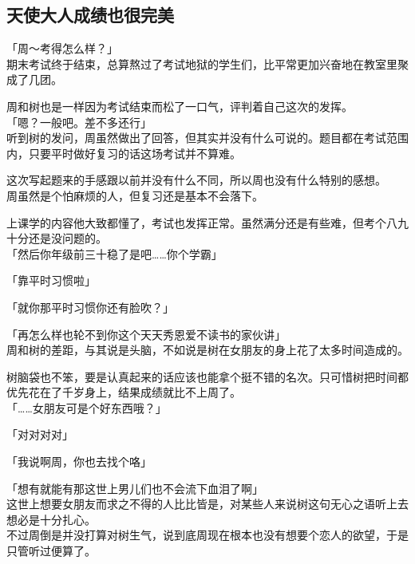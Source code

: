 \subsection{天使大人成绩也很完美}

「周～考得怎么样？」\\

期末考试终于结束，总算熬过了考试地狱的学生们，比平常更加兴奋地在教室里聚成了几团。

周和树也是一样因为考试结束而松了一口气，评判着自己这次的发挥。\\

「嗯？一般吧。差不多还行」\\

听到树的发问，周虽然做出了回答，但其实并没有什么可说的。题目都在考试范围内，只要平时做好复习的话这场考试并不算难。

这次写起题来的手感跟以前并没有什么不同，所以周也没有什么特别的感想。\\

周虽然是个怕麻烦的人，但复习还是基本不会落下。

上课学的内容他大致都懂了，考试也发挥正常。虽然满分还是有些难，但考个八九十分还是没问题的。\\

「然后你年级前三十稳了是吧……你个学霸」

「靠平时习惯啦」

「就你那平时习惯你还有脸吹？」

「再怎么样也轮不到你这个天天秀恩爱不读书的家伙讲」\\

周和树的差距，与其说是头脑，不如说是树在女朋友的身上花了太多时间造成的。

树脑袋也不笨，要是认真起来的话应该也能拿个挺不错的名次。只可惜树把时间都优先花在了千岁身上，结果成绩就比不上周了。\\

「……女朋友可是个好东西哦？」

「对对对对」

「我说啊周，你也去找个咯」

「想有就能有那这世上男儿们也不会流下血泪了啊」\\

这世上想要女朋友而求之不得的人比比皆是，对某些人来说树这句无心之语听上去想必是十分扎心。\\

不过周倒是并没打算对树生气，说到底周现在根本也没有想要个恋人的欲望，于是只管听过便算了。\\

